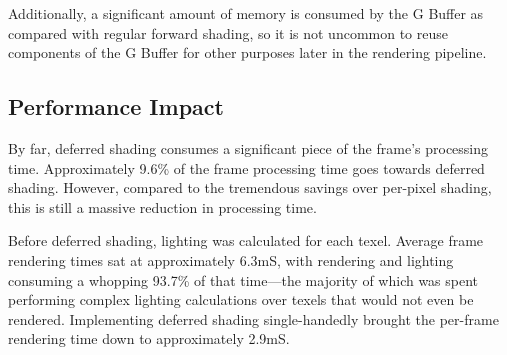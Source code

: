 \documentclass[11pt, oneside]{report}
\begin{document}
Additionally, a significant amount of memory is consumed by the \gls{G Buffer} as compared with regular \gls{forward shading}, so it is not uncommon to reuse components of the \gls{G Buffer} for other purposes later in the rendering pipeline.

\subsection{Performance Impact}
By far, deferred shading consumes a significant piece of the frame's processing time. Approximately 9.6\% of the frame processing time goes towards deferred shading. However, compared to the tremendous savings over per-pixel shading, this is still a massive reduction in processing time.

Before deferred shading, lighting was calculated for each \gls{texel}. Average frame rendering times sat at approximately 6.3mS, with rendering and lighting consuming a whopping 93.7\% of that time---the majority of which was spent performing complex lighting calculations over texels that would not even be rendered. Implementing deferred shading single-handedly brought the per-frame rendering time down to approximately 2.9mS.
\end{document}
